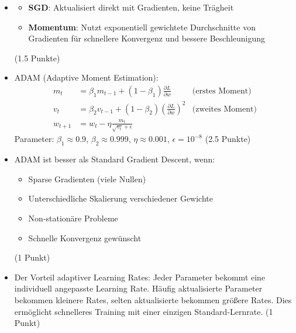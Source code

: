 \begin{itemize}
\item [b)] 
\begin{itemize}
  \item \textbf{SGD}: Aktualisiert direkt mit Gradienten, keine Trägheit
  \item \textbf{Momentum}: Nutzt exponentiell gewichtete Durchschnitte von Gradienten für schnellere Konvergenz und bessere Beschleunigung
\end{itemize}
(1.5 Punkte)
\end{itemize}

\begin{itemize}
\item [c)] ADAM (Adaptive Moment Estimation):
\begin{align}
m_t &= \beta_1 m_{t-1} + (1-\beta_1) \frac{\partial L}{\partial w} & \text{(erstes Moment)} \\
v_t &= \beta_2 v_{t-1} + (1-\beta_2) \left(\frac{\partial L}{\partial w}\right)^2 & \text{(zweites Moment)} \\
w_{t+1} &= w_t - \eta \frac{m_t}{\sqrt{v_t} + \epsilon}
\end{align}
Parameter: $\beta_1 \approx 0.9$, $\beta_2 \approx 0.999$, $\eta \approx 0.001$, $\epsilon = 10^{-8}$ (2.5 Punkte)
\end{itemize}

\begin{itemize}
\item [d)] ADAM ist besser als Standard Gradient Descent, wenn:
\begin{itemize}
  \item Sparse Gradienten (viele Nullen)
  \item Unterschiedliche Skalierung verschiedener Gewichte
  \item Non-stationäre Probleme
  \item Schnelle Konvergenz gewünscht
\end{itemize}
(1 Punkt)
\end{itemize}

\begin{itemize}
\item [e)] Der Vorteil adaptiver Learning Rates: Jeder Parameter bekommt eine individuell angepasste Learning Rate. Häufig aktualisierte Parameter bekommen kleinere Rates, selten aktualisierte bekommen größere Rates. Dies ermöglicht schnelleres Training mit einer einzigen Standard-Lernrate. (1 Punkt)
\end{itemize}
